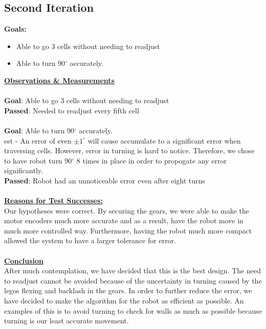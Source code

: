 \documentclass[11pt]{article}
\begin{document}
\subsection{Second Iteration}
\textbf{Goals:}
\begin{itemize}
\item Able to go 3 cells without needing to readjust
\item Able to turn 90$^{\circ}$ accurately.
\end{itemize}
\underline{\textbf{Observations \& Measurements}}\\\\
\textbf{Goal}: Able to go 3 cells without needing to readjust\\
\textbf{Passed}: Needed to readjust every fifth cell\\\\
\textbf{Goal}: Able to turn 90$^{\circ}$ accurately.\\
est - An error of even $ \pm 1^{\circ}$ will cause accumulate to a significant error when traversing cells. However, error in turning is hard to notice. Therefore, we chose to have robot turn 90$^{\circ}$ 8 times in place in order to propogate any error significantly. \\
\textbf{Passed}: Robot had an unnoticeable error even after eight turns\\\\
\textbf{\underline{Reasons for Test Successes:}}\\
Our hypotheses were correct. By securing the gears, we were able to make the motor encoders much more accurate and as a result, have the robot move in much more controlled way. Furthermore, having the robot much more compact allowed the system to have a larger tolerance for error.\\\\
\underline{\textbf{Conclusion}}\\
After much contemplation, we have decided that this is the best design. The need to readjust cannot be avoided because of the uncertainty in turning caused by the legos flexing and backlash in the gears. In order to further reduce the error, we have decided to make the algorithm for the robot as efficient as possible. An examples of this is to avoid turning to check for walls as much as possible because turning is our least accurate movement.


\newpage

\end{document}
